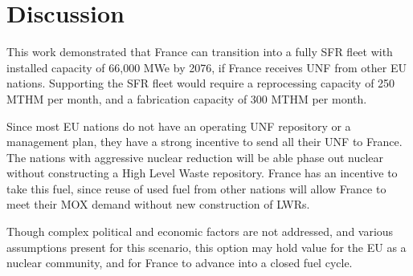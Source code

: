 \section{Discussion}
This work demonstrated that France can transition into
a fully \gls{SFR} fleet with installed capacity of 66,000 MWe by 2076,
if France receives \gls{UNF} from other \gls{EU} nations.
Supporting the \gls{SFR} fleet would require a reprocessing capacity of 250 MTHM per month,
and a fabrication capacity of 300 MTHM per month.

Since most \gls{EU} nations do not have an operating \gls{UNF}
repository or a management plan, they have a strong incentive
to send all their \gls{UNF} to France. The nations
with aggressive nuclear reduction will be able phase out nuclear
without constructing a High Level Waste repository. France has an
incentive to take this fuel, since reuse of used fuel from
other nations will allow France to meet their MOX demand
without new construction of \glspl{LWR}.

Though complex political and economic factors are not
addressed, and various assumptions present for this scenario,
this option may hold value for the \gls{EU} as a nuclear community,
and for France to advance into a closed fuel cycle.
